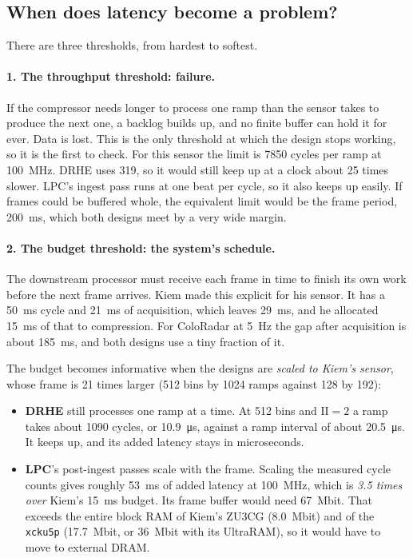 \subsection{When does latency become a problem?}
\label{sec:latproblem}

There are three thresholds, from hardest to softest.

\paragraph{1. The throughput threshold: failure.} If the compressor needs
longer to process one ramp than the sensor takes to produce the next one, a
backlog builds up, and no finite buffer can hold it for ever. Data is lost.
This is the only threshold at which the design stops working, so it is the
first to check. For this sensor the limit is \num{7850} cycles per ramp at
\SI{100}{\mega\hertz}. DRHE uses \num{319}, so it would still keep up at a
clock about 25 times slower. LPC's ingest pass runs at one beat per cycle, so
it also keeps up easily. If frames could be buffered whole, the equivalent
limit would be the frame period, \SI{200}{\milli\second}, which both designs
meet by a very wide margin.

\paragraph{2. The budget threshold: the system's schedule.} The downstream
processor must receive each frame in time to finish its own work before the
next frame arrives. Kiem made this explicit for his sensor. It has a
\SI{50}{\milli\second} cycle and \SI{21}{\milli\second} of acquisition, which
leaves \SI{29}{\milli\second}, and he allocated \SI{15}{\milli\second} of that
to compression. For ColoRadar at \SI{5}{\hertz} the gap after acquisition is
about \SI{185}{\milli\second}, and both designs use a tiny fraction of it.

The budget becomes informative when the designs are \emph{scaled to Kiem's
sensor}, whose frame is 21 times larger (512 bins by 1024 ramps against 128 by
192):

\begin{itemize}
\item \textbf{DRHE} still processes one ramp at a time. At 512 bins and
$\mathrm{II} = 2$ a ramp takes about \num{1090} cycles, or
\SI{10.9}{\micro\second}, against a ramp interval of about
\SI{20.5}{\micro\second}. It keeps up, and its added latency stays in
microseconds.
\item \textbf{LPC}'s post-ingest passes scale with the frame. Scaling the
measured cycle counts gives roughly \SI{53}{\milli\second} of added latency
at \SI{100}{\mega\hertz}, which is \emph{3.5 times over} Kiem's
\SI{15}{\milli\second} budget. Its frame buffer would need
\SI{67}{\mega bit}. That exceeds the entire block RAM of Kiem's ZU3CG
(\SI{8.0}{\mega bit}) and of the \texttt{xcku5p} (\SI{17.7}{\mega bit},
or \SI{36}{\mega bit} with its UltraRAM), so
it would have to move to external DRAM.
\end{itemize}

